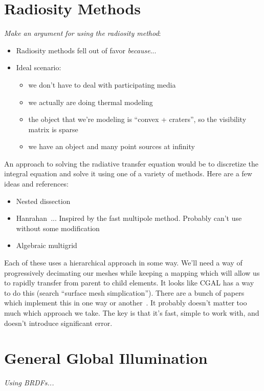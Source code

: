 \documentclass{article}
\begin{document}
\section{Radiosity Methods}

\emph{Make an argument for using the radiosity method}:
\begin{itemize}
\item Radiosity methods fell out of favor \emph{because}...
\item Ideal scenario:
  \begin{itemize}
  \item we don't have to deal with participating media
  \item we actually are doing thermal modeling
  \item the object that we're modeling is ``convex + craters'', so the
    visibility matrix is sparse
  \item we have an object and many point sources at infinity
  \end{itemize}
\end{itemize}

An approach to solving the radiative transfer equation would be to
discretize the integral equation and solve it using one of a variety
of methods. Here are a few ideas and references:
\begin{itemize}
\item Nested dissection
\item Hanrahan~\cite{hanrahan1991rapid}... Inspired by the fast
  multipole method. Probably can't use without some modification
\item Algebraic multigrid
\end{itemize}

Each of these uses a hierarchical approach in some way. We'll need a
way of progressively decimating our meshes while keeping a mapping
which will allow us to rapidly transfer from parent to child
elements. It looks like CGAL has a way to do this (search ``surface
mesh simplication''). There are a bunch of papers which implement this
in one way or another~\cite{khodakovsky2000progressive}. It probably
doesn't matter too much which approach we take. The key is that it's
fast, simple to work with, and doesn't introduce significant error.

\section{General Global Illumination}

\emph{Using BRDFs...}



\end{document}
